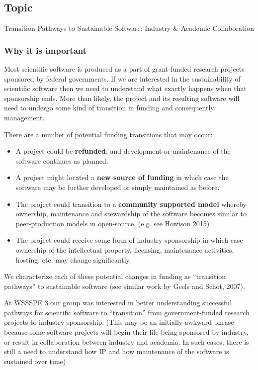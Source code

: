 \subsection{Topic} 

Transition Pathways to Sustainable Software: Industry \& Academic Collaboration

\subsubsection{Why it is important}

Most scientific software is produced as a part of grant-funded research projects sponsored by federal governments. If we are interested in the sustainability of scientific software then we need to understand what exactly happens when that sponsorship ends. More than likely, the project and its resulting software will need to undergo some kind of transition in funding and consequently management. 

There are a number of potential funding transitions that may occur:  

\begin{itemize}
\item A project could be \textbf{refunded}, and development or maintenance of the software continues as planned.
\item A project might located a \textbf{new source of funding} in which case the software may be further developed or simply maintained as before. 
\item The project could transition to a \textbf{community supported model} whereby ownership, maintenance and stewardship of the software becomes similar to peer-production models in open-source. (e.g. see Howison 2015)
\item The project could receive some form of industry sponsorship in which case ownership of the intellectual property, licensing, maintenance activities, hosting, etc. may change significantly. 
\end{itemize}

We characterize each of these potential changes in funding as ``transition pathways'' to sustainable software (see similar work by Geels and Schot, 2007). 

At WSSSPE 3 our group was interested in better understanding successful pathways for scientific software to ``transition'' from government-funded research projects to industry sponsorship. (This may be an initially awkward phrase - because some software projects will begin their life being sponsored by industry, or result in collaboration between industry and academia. In such cases, there is still a need to understand how IP and how maintenance of the software is sustained over time)

